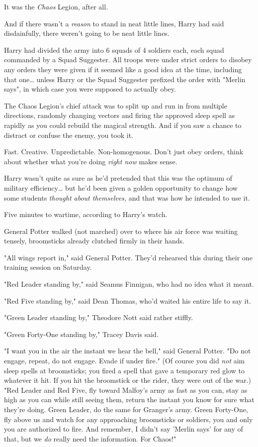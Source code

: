 It was the \emph{Chaos} Legion, after all.

And if there wasn't a \emph{reason} to stand in neat little lines, Harry had 
said disdainfully, there weren't going to be neat little lines.

Harry had divided the army into 6 squads of 4 soldiers each, each squad 
commanded by a Squad Suggester. All troops were under strict orders to disobey 
any orders they were given if it seemed like a good idea at the time, including 
that one{\ldots} unless Harry or the Squad Suggester prefixed the order with 
"Merlin says", in which case you were supposed to actually obey.

The Chaos Legion's chief attack was to split up and run in from multiple 
directions, randomly changing vectors and firing the approved sleep spell as 
rapidly as you could rebuild the magical strength. And if you saw a chance to 
distract or confuse the enemy, you took it.

Fast. Creative. Unpredictable. Non-homogenous. Don't just obey orders, think 
about whether what you're doing \emph{right now} makes sense.

Harry wasn't quite as sure as he'd pretended that this was the optimum of 
military efficiency{\ldots} but he'd been given a golden opportunity to change 
how some students \emph{thought about themselves,} and that was how he intended 
to use it.

Five minutes to wartime, according to Harry's watch.

General Potter walked (not marched) over to where his air force was waiting 
tensely, broomsticks already clutched firmly in their hands.

"All wings report in," said General Potter. They'd rehearsed this during their 
one training session on Saturday.

"Red Leader standing by," said Seamus Finnigan, who had no idea what it meant.

"Red Five standing by," said Dean Thomas, who'd waited his entire life to say 
it.

"Green Leader standing by," Theodore Nott said rather stiffly.

"Green Forty-One standing by," Tracey Davis said.

"I want you in the air the instant we hear the bell," said General Potter. "Do 
not engage, repeat, do not engage. Evade if under fire." (Of course you did 
\emph{not} aim sleep spells at broomsticks; you fired a spell that gave a 
temporary red glow to whatever it hit. If you hit the broomstick or the rider, 
they were out of the war.) "Red Leader and Red Five, fly toward Malfoy's army 
as fast as you can, stay as high as you can while still seeing them, return the 
instant you know for sure what they're doing. Green Leader, do the same for 
Granger's army. Green Forty-One, fly above us and watch for any approaching 
broomsticks or soldiers, you and only you are authorized to fire. And remember, 
I didn't say 'Merlin says' for any of that, but we \emph{do} really need the 
information. For Chaos!"

